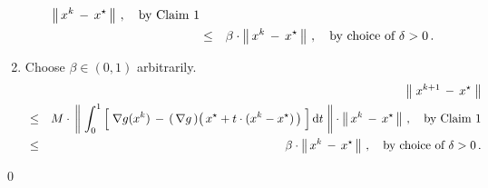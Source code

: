 \begin{enumerate}
\begin{eqnarray*}
		\left\Vert\,x^{k} \,-\, x^{\star}\,\right\Vert\,,
		\quad
		\textnormal{by Claim 1}
	\\
	&\leq&
		\beta \cdot \left\Vert\,x^{k} \,-\, x^{\star}\,\right\Vert\,,
		\quad
		\textnormal{by choice of $\delta > 0$}\,.
	\end{eqnarray*}
\item
	Choose $\beta \in (0,1)$ arbitrarily.
	\begin{eqnarray*}
	&&
		\left\Vert\;x^{k+1} \,-\, x^{\star}\;\right\Vert
	\\
	&\leq&
		M \cdot\,
		\left\Vert\;
			\int_{0}^{1}
			\left[\;
				\overset{{\color{white}.}}{\nabla} g(x^{k})
				\,-\,
				\left(\,\nabla g\,\right)\!\left(\,x^{\star} + t\cdot(x^{k}-x^{\star})\,\right)
			\;\right]
			\d t
		\;\right\Vert
		\cdot
		\left\Vert\,x^{k} \,-\, x^{\star}\,\right\Vert\,,
		\quad
		\textnormal{by Claim 1}
	\\
	&\leq&
		\beta \cdot \left\Vert\,x^{k} \,-\, x^{\star}\,\right\Vert\,,
		\quad
		\textnormal{by choice of $\delta > 0$}\,.
	\end{eqnarray*}
\end{enumerate}
\qed



\renewcommand{\theenumi}{\roman{enumi}}
\renewcommand{\labelenumi}{\textnormal{(\theenumi)}$\;\;$}

